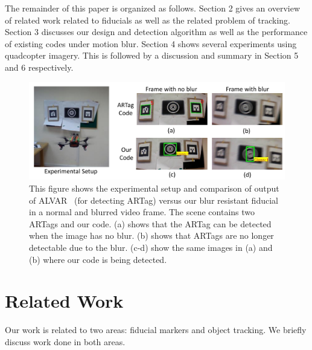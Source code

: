 \documentclass[runningheads]{llncs}
\begin{document}
The remainder of this paper is organized as follows.  Section 2 gives an
overview of related work related to fiducials as well as the related problem of
tracking. Section 3 discusses our design and detection algorithm as well as
the performance of existing codes under motion blur. Section 4 shows several
experiments using quadcopter imagery. This is followed by a discussion and
summary in Section 5 and 6 respectively.

\begin{figure}
\includegraphics[width=\linewidth]{teaser.pdf}
\caption{This figure shows the experimental setup and comparison of
output of ALVAR~\cite{alvar} (for detecting ARTag) versus our blur resistant
fiducial in a normal and blurred video frame. The scene contains two ARTags and our code.
(a) shows that the ARTag can be detected when the image has no blur.
(b) shows that ARTags are no longer detectable due to the blur.
(c-d) show the same images in (a) and (b) where our code is being detected.}
\label{fig:teaser}
\end{figure}

\section{Related Work}

Our work is related to two areas: fiducial markers and object tracking. We
briefly discuss work done in both areas.
\end{document}
